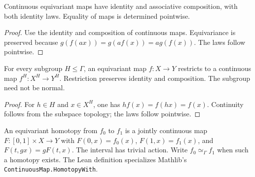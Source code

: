 \begin{proposition}\label{prop:equivariant-map-laws}
Continuous equivariant maps have identity and associative composition, with
both identity laws. Equality of maps is determined pointwise.
\end{proposition}
\begin{proof}
\leanok
Use the identity and composition of continuous maps. Equivariance is
preserved because $g(f(ax))=g(af(x))=ag(f(x))$. The laws follow pointwise.
\end{proof}

\begin{proposition}\label{prop:fixed-point-map-functoriality}
For every subgroup $H\leq\Gamma$, an equivariant map $f:X\to Y$ restricts
to a continuous map $f^H:X^H\to Y^H$. Restriction preserves identity and
composition. The subgroup need not be normal.
\end{proposition}
\begin{proof}
\leanok
For $h\in H$ and $x\in X^H$, one has $hf(x)=f(hx)=f(x)$.
Continuity follows from the subspace topology; the laws follow pointwise.
\end{proof}

\begin{definition}\label{def:equivariant-homotopy}
\leanok
An equivariant homotopy from $f_0$ to $f_1$ is a jointly continuous map
$F:[0,1]\times X\to Y$ with $F(0,x)=f_0(x)$, $F(1,x)=f_1(x)$, and
$F(t,gx)=gF(t,x)$. The interval has trivial action.
Write $f_0\simeq_\Gamma f_1$ when such a homotopy exists.
The Lean definition specializes Mathlib's \texttt{ContinuousMap.HomotopyWith}.
\end{definition}

